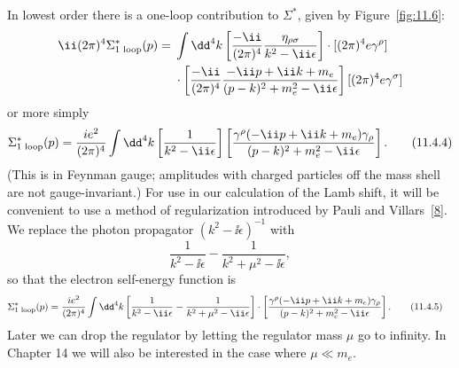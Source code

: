 In lowest order there is a one-loop contribution to $\Sigma^*$, given by
Figure~\ref{fig:11.6}:
\begin{align*}
\ii(2\pi)^4\Sigma^*_{\text{1 loop}}(p)
={}&\int \dd^4k\left[\frac{-\ii}{(2\pi)^4}
\frac{\eta_{\rho\sigma}}{k^2-\ii\epsilon}\right]
\cdot[(2\pi)^4e\gamma^\rho]\notag\\
&\cdot\left[\frac{-\ii}{(2\pi)^4}
\frac{-\ii\sl{p}+\ii\sl{k}+m_e}{(p-k)^2+m_e^2-\ii\epsilon}\right]
[(2\pi)^4e\gamma^\sigma]
\end{align*}
or more simply
\begin{equation}
\Sigma^*_{\text{1 loop}}(p)=\frac{ie^2}{(2\pi)^4}\int \dd^4k
\left[\frac{1}{k^2-\ii\epsilon}\right]
\left[\frac{\gamma^\rho(-\ii\sl{p}+\ii\sl{k}+m_e)\gamma_\rho}
{(p-k)^2+m_e^2-\ii\epsilon}\right].
\tag{11.4.4}\label{eq:11.4.4}
\end{equation}
(This is in Feynman gauge; amplitudes with charged particles off the mass
shell are not gauge-invariant.) For use in our calculation of the Lamb shift,
it will be convenient to use a method of regularization introduced by Pauli
and Villars~\hyperref[ref:11.8]{[8]}. We replace the photon propagator $(k^2-\ii\epsilon)^{-1}$ with
\[
\frac{1}{k^2-\ii\epsilon}-\frac{1}{k^2+\mu^2-\ii\epsilon},
\]
so that the electron self-energy function is
\begin{align}
\Sigma^*_{\text{1 loop}}(p)={}&\frac{ie^2}{(2\pi)^4}\int \dd^4k
\left[\frac{1}{k^2-\ii\epsilon}
-\frac{1}{k^2+\mu^2-\ii\epsilon}\right] \cdot \left[\frac{\gamma^\rho(-\ii\sl{p}+\ii\sl{k}+m_e)\gamma_\rho}
{(p-k)^2+m_e^2-\ii\epsilon}\right].
\tag{11.4.5}\label{eq:11.4.5}
\end{align}
Later we can drop the regulator by letting the regulator mass $\mu$ go to
infinity. In Chapter 14 we will also be interested in the case where
$\mu\ll m_e$.

